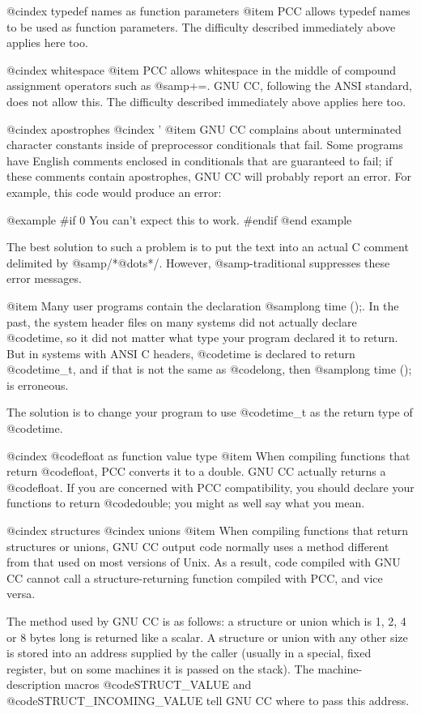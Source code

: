 @cindex typedef names as function parameters
@item
PCC allows typedef names to be used as function parameters.  The
difficulty described immediately above applies here too.

@cindex whitespace
@item
PCC allows whitespace in the middle of compound assignment operators
such as @samp{+=}.  GNU CC, following the ANSI standard, does not
allow this.  The difficulty described immediately above applies here
too.

@cindex apostrophes
@cindex '
@item
GNU CC complains about unterminated character constants inside of
preprocessor conditionals that fail.  Some programs have English
comments enclosed in conditionals that are guaranteed to fail; if these
comments contain apostrophes, GNU CC will probably report an error.  For
example, this code would produce an error:

@example
#if 0
You can't expect this to work.
#endif
@end example

The best solution to such a problem is to put the text into an actual
C comment delimited by @samp{/*@dots{}*/}.  However,
@samp{-traditional} suppresses these error messages.

@item
Many user programs contain the declaration @samp{long time ();}.  In the
past, the system header files on many systems did not actually declare
@code{time}, so it did not matter what type your program declared it to
return.  But in systems with ANSI C headers, @code{time} is declared to
return @code{time_t}, and if that is not the same as @code{long}, then
@samp{long time ();} is erroneous.

The solution is to change your program to use @code{time_t} as the return
type of @code{time}.

@cindex @code{float} as function value type
@item
When compiling functions that return @code{float}, PCC converts it to
a double.  GNU CC actually returns a @code{float}.  If you are concerned
with PCC compatibility, you should declare your functions to return
@code{double}; you might as well say what you mean.

@cindex structures
@cindex unions
@item
When compiling functions that return structures or unions, GNU CC
output code normally uses a method different from that used on most
versions of Unix.  As a result, code compiled with GNU CC cannot call
a structure-returning function compiled with PCC, and vice versa.

The method used by GNU CC is as follows: a structure or union which is
1, 2, 4 or 8 bytes long is returned like a scalar.  A structure or union
with any other size is stored into an address supplied by the caller
(usually in a special, fixed register, but on some machines it is passed
on the stack).  The machine-description macros @code{STRUCT_VALUE} and
@code{STRUCT_INCOMING_VALUE} tell GNU CC where to pass this address.

